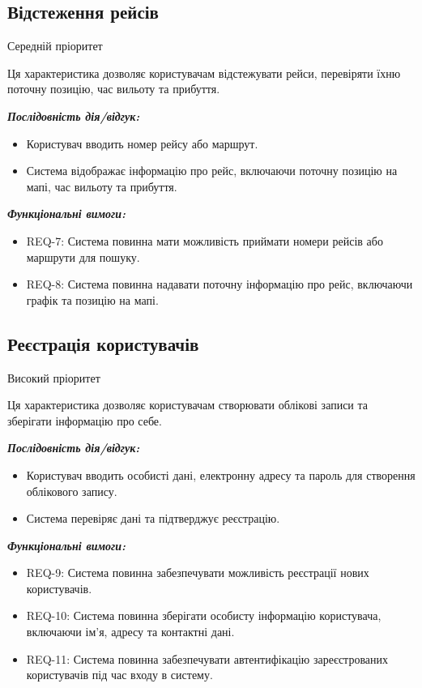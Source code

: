 \documentclass[14pt]{extreport}
\begin{document}
\begin{normalsize}
	\subsection*{Відстеження рейсів} 
	Середній пріоритет
	
	Ця характеристика дозволяє користувачам відстежувати рейси, перевіряти їхню поточну позицію, час вильоту та прибуття.
	
	\textbf{\textit{Послідовність дія/відгук:}}
	\begin{itemize}
		\item Користувач вводить номер рейсу або маршрут.
		\item Система відображає інформацію про рейс, включаючи поточну позицію на мапі, час вильоту та прибуття.
	\end{itemize}
	
	\textbf{\textit{Функціональні вимоги:}}
	\begin{itemize}
		\item REQ-7: Система повинна мати можливість приймати номери рейсів або маршрути для пошуку.
		\item REQ-8: Система повинна надавати поточну інформацію про рейс, включаючи графік та позицію на мапі.
	\end{itemize}

	\subsection*{Реєстрація користувачів} 
	Високий пріоритет
	
	Ця характеристика дозволяє користувачам створювати облікові записи та зберігати інформацію про себе.
	
	\textbf{\textit{Послідовність дія/відгук:}}
	\begin{itemize}
		\item Користувач вводить особисті дані, електронну адресу та пароль для створення облікового запису.
		\item Система перевіряє дані та підтверджує реєстрацію.
	\end{itemize}
	
	\textbf{\textit{Функціональні вимоги:}}
	\begin{itemize}
		\item REQ-9: Система повинна забезпечувати можливість реєстрації нових користувачів.
		\item REQ-10: Система повинна зберігати особисту інформацію користувача, включаючи ім'я, адресу та контактні дані.
		\item REQ-11: Система повинна забезпечувати автентифікацію зареєстрованих користувачів під час входу в систему.
	\end{itemize}
	

\end{normalsize}
\end{document}
